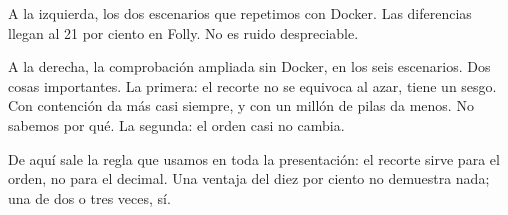 A la izquierda, los dos escenarios que repetimos con Docker. Las diferencias llegan al 21 por ciento en Folly. No es ruido despreciable.

A la derecha, la comprobación ampliada sin Docker, en los seis escenarios. Dos cosas importantes. La primera: el recorte no se equivoca al azar, tiene un sesgo. Con contención da más casi siempre, y con un millón de pilas da menos. No sabemos por qué. La segunda: el orden casi no cambia.

De aquí sale la regla que usamos en toda la presentación: el recorte sirve para el orden, no para el decimal. Una ventaja del diez por ciento no demuestra nada; una de dos o tres veces, sí.
